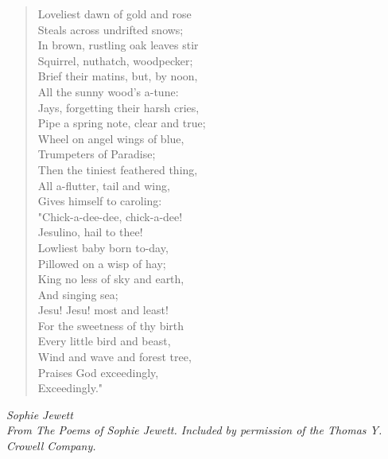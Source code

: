 
\begin{verse}
Loveliest dawn of gold and rose\\
Steals across undrifted snows;\\
In brown, rustling oak leaves stir\\
Squirrel, nuthatch, woodpecker;\\
Brief their matins, but, by noon,\\
All the sunny wood's a-tune:\\
Jays, forgetting their harsh cries,\\
Pipe a spring note, clear and true;\\
Wheel on angel wings of blue,\\
Trumpeters of Paradise;\\
Then the tiniest feathered thing,\\
All a-flutter, tail and wing,\\
Gives himself to caroling:\\[0.7em]

"Chick-a-dee-dee, chick-a-dee!\\
Jesulino, hail to thee!\\
Lowliest baby born to-day,\\
Pillowed on a wisp of hay;\\
King no less of sky and earth,\\
\hspace*{8em}And singing sea;\\
Jesu! Jesu! most and least!\\
For the sweetness of thy birth\\
Every little bird and beast,\\
Wind and wave and forest tree,\\
Praises God exceedingly,\\
\hspace*{12em}Exceedingly."%
\end{verse}

\vspace{0.5\baselineskip}
\noindent\textit{Sophie Jewett}\\
\noindent\textit{From \emph{The Poems of Sophie Jewett.} Included by permission of the Thomas Y. Crowell Company.}

\newpage
